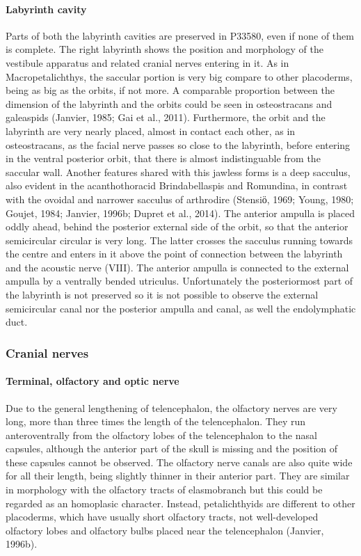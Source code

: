 \documentclass[12pt,letterpaper]{article}
\begin{document}
\paragraph{Labyrinth cavity}

Parts of both the labyrinth cavities are preserved in P33580, even if none of them is complete. The right labyrinth shows the position and morphology of the vestibule apparatus and related cranial nerves entering in it. As in Macropetalichthys, the saccular portion is very big compare to other placoderms, being as big as the orbits, if not more. A comparable proportion between the dimension of the labyrinth and the orbits could be seen in osteostracans and galeaspids (Janvier, 1985; Gai et al., 2011). Furthermore, the orbit and the labyrinth are very nearly placed, almost in contact each other, as in osteostracans, as the facial nerve passes so close to the labyrinth, before entering in the ventral posterior orbit, that there is almost indistinguable from the saccular wall. Another features shared with this jawless forms is a deep sacculus, also evident in the acanthothoracid Brindabellaspis and Romundina, in contrast with the ovoidal and narrower sacculus of arthrodire (Stensiӧ, 1969; Young, 1980; Goujet, 1984; Janvier, 1996b; Dupret et al., 2014).
The anterior ampulla is placed oddly ahead, behind the posterior external side of the orbit, so that the anterior semicircular circular is very long. The latter crosses the sacculus running towards the centre and enters in it above the point of connection between the labyrinth and the acoustic nerve (VIII). The anterior ampulla is connected to the external ampulla by a ventrally bended utriculus. Unfortunately the posteriormost part of the labyrinth is not preserved so it is not possible to observe the external semicircular canal nor the posterior ampulla and canal, as well the endolymphatic duct.

\subsubsection{Cranial nerves}
\paragraph{Terminal, olfactory and optic nerve}
Due to the general lengthening of telencephalon, the olfactory nerves are very long, more than three times the length of the telencephalon. They run anteroventrally from the olfactory lobes of the telencephalon to the nasal capsules, although the anterior part of the skull is missing and the position of these capsules cannot be observed. The olfactory nerve canals are also quite wide for all their length, being slightly thinner in their anterior part. They are similar in morphology with the olfactory tracts of elasmobranch but this could be regarded as an homoplasic character. Instead, petalichthyids are different to other placoderms, which have usually short olfactory tracts, not well-developed olfactory lobes and olfactory bulbs placed near the telencephalon (Janvier, 1996b).
\end{document}
